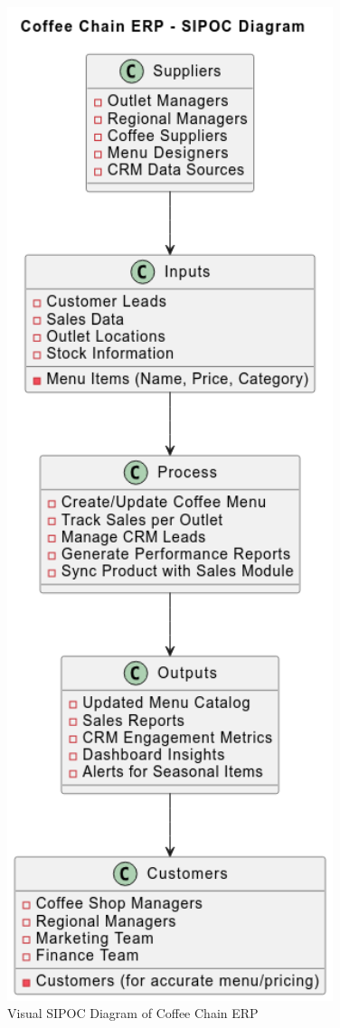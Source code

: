 \begin{figure}[H]
\centering
\includegraphics[width=0.85\textwidth,height=0.6\textheight,keepaspectratio]{diagrams/SIPOC.png}
\caption{Visual SIPOC Diagram of Coffee Chain ERP}
\end{figure}

